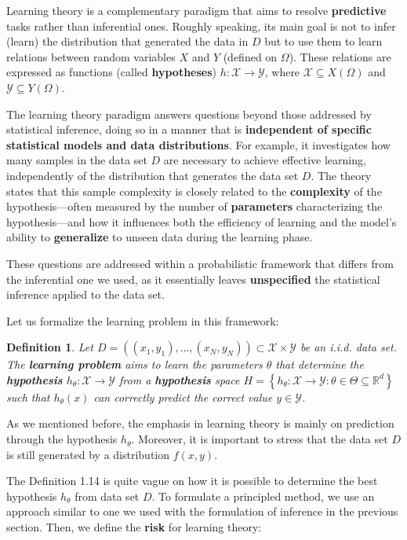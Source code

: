 \documentclass{report}
\newtheorem{definition}{Definition}[chapter]
\begin{document}
Learning theory is a complementary paradigm that aims to resolve \textbf{predictive} tasks rather than inferential ones. Roughly speaking, its main goal is not to infer (learn) the distribution that generated the data in $D$ but to use them to learn relations between random variables $X$ and $Y$ (defined on $\Omega$). These relations are expressed as functions (called \textbf{hypotheses}) $h : \mathcal{X} \to \mathcal{Y}$, where $\mathcal{X} \subseteq X(\Omega)$ and $\mathcal{Y} \subseteq Y(\Omega)$.

The learning theory paradigm answers questions beyond those addressed by statistical inference, doing so in a manner that is \textbf{independent of specific statistical models and data distributions}. For example, it investigates how many samples in the data set $D$ are necessary to achieve effective learning, independently of the distribution that generates the data set $D$. The theory states that this sample complexity is closely related to the \textbf{complexity} of the hypothesis—often measured by the number of \textbf{parameters} characterizing the hypothesis—and how it influences both the efficiency of learning and the model’s ability to \textbf{generalize} to unseen data during the learning phase.

These questions are addressed within a probabilistic framework that differs from the inferential one we used, as it essentially leaves \textbf{unspecified} the statistical inference applied to the data set.

Let us formalize the learning problem in this framework:
\begin{definition}
Let $D = ((x_1,y_1),\dots,(x_N,y_N)) \subset \mathcal{X}\times \mathcal{Y}$ be an i.i.d. data set. The \textbf{learning problem} aims to learn the parameters $\theta$ that determine the \textbf{hypothesis} $h_\theta : \mathcal{X}\to \mathcal{Y}$ from a \textbf{hypothesis} space $H = \left\{h_\theta : \mathcal{X}\to \mathcal{Y} : \theta \in \Theta \subseteq \mathbb{R}^d\right\}$ such that $h_\theta(x)$ can correctly predict the correct value $y \in \mathcal{Y}$.
\end{definition}

As we mentioned before, the emphasis in learning theory is mainly on prediction through the hypothesis $h_\theta$. Moreover, it is important to stress that the data set $D$ is still generated by a distribution $f(x,y)$.

The Definition 1.14 is quite vague on how it is possible to determine the best hypothesis $h_\theta$ from data set $D$. To formulate a principled method, we use an approach similar to one we used with the formulation of inference in the previous section. Then, we define the \textbf{risk} for learning theory:
\end{document}
